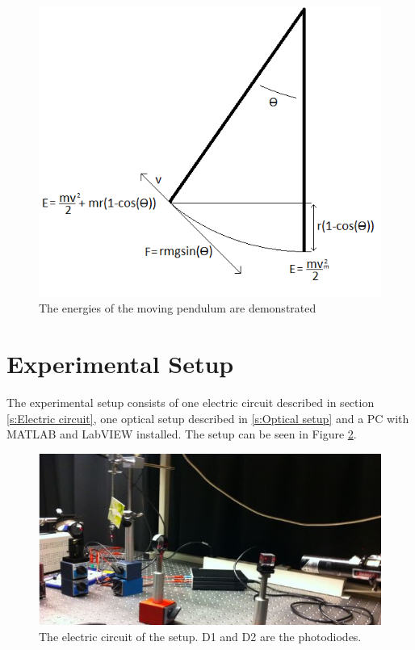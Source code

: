 ﻿\documentclass[11pt, a4paper]{article}
\begin{document}
\begin{figure}[h]
	\centering
	\includegraphics{pendulummotion}
	\caption{The energies of the moving pendulum are demonstrated}
	\label{f:pendulummotion}
\end{figure}


\section{Experimental Setup}
The experimental setup consists of one electric circuit described in section 
\ref{s:Electric circuit}, one optical setup described in \ref{s:Optical setup} and 
a PC with MATLAB and LabVIEW installed. 
The setup can be seen in Figure \ref{f:setup}. 

\begin{figure}[h]
	\centering
	\includegraphics{setup}
	\caption{The electric circuit of the setup. D1 and D2 are the photodiodes.}
	\label{f:setup}
\end{figure}
\end{document}
